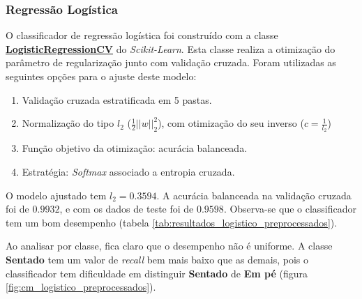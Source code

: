 \documentclass[final,5p]{elsarticle}
\numberwithin{equation}{section}
\begin{document}
    \subsubsection{Regressão Logística} \label{sec:logistica}

        O classificador de regressão logística foi construído com a classe \href{https://scikit-learn.org/stable/modules/generated/sklearn.linear_model.LogisticRegressionCV.html}{\textbf{LogisticRegressionCV}} do \emph{Scikit-Learn}. Esta classe realiza a otimização do parâmetro de regularização junto com validação cruzada. Foram utilizadas as seguintes opções para o ajuste deste modelo:

        \begin{enumerate}
            \item Validação cruzada estratificada em 5 pastas.
            \item Normalização do tipo $l_2$ ($\frac{1}{2} ||w||_2^2$), com otimização do seu inverso ($c = \frac{1}{l_2}$)
            \item Função objetivo da otimização: acurácia balanceada.
            \item Estratégia: \emph{Softmax} associado a entropia cruzada.
        \end{enumerate}

        O modelo ajustado tem $l_2 = 0.3594$. A acurácia balanceada na validação cruzada foi de $0.9932$, e com os dados de teste foi de $0.9598$. Observa-se que o classificador tem um bom desempenho (tabela \ref{tab:resultados_logistico_preprocessados}).

        Ao analisar por classe, fica claro que o desempenho não é uniforme. A classe \textbf{Sentado} tem um valor de \emph{recall} bem mais baixo que as demais, pois o classificador tem dificuldade em distinguir \textbf{Sentado} de \textbf{Em pé} (figura \ref{fig:cm_logistico_preprocessados}).
\end{document}
